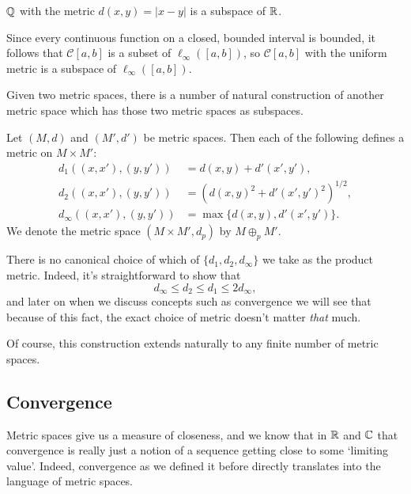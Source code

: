 \documentclass[a4paper]{scrartcl}
\begin{document}
\begin{example}[$\Q$ is a subspace of $\R$]
$\Q$ with the metric $d(x, y) = |x - y|$ is a subspace of $\R$.   
\end{example}

\begin{example}
    Since every continuous function on a closed, bounded interval is bounded, it follows that $\mathcal{C}[a, b]$ is a subset of $\ell_{\infty}([a, b])$, so $\mathcal{C}[a, b]$ with the uniform metric is a subspace of $\ell_{\infty}([a, b])$.
\end{example}

Given two metric spaces, there is a number of natural construction of another metric space which has those two metric spaces as subspaces.

\begin{definition}    
    Let $(M, d)$ and $(M', d')$ be metric spaces. Then each of the following defines a metric on $M \times M'$:
    \begin{align*}
        d_1((x, x'), (y, y')) &= d(x, y) + d'(x', y') ,\\
        d_2((x, x'), (y, y')) &= \left(d(x, y)^2 + d'(x', y')^2\right)^{1/2} ,\\
        d_{\infty}((x, x'), (y, y')) &= \max\{d(x, y), d'(x', y')\}.
    \end{align*}
    We denote the metric space $(M \times M', d_p)$ by $M \oplus_p M'$.
\end{definition}

\begin{remark}
    There is no canonical choice of which of $\{d_1, d_2, d_{\infty}\}$ we take as the product metric. Indeed, it's straightforward to show that
    $$
    d_{\infty} \leq d_2 \leq d_1 \leq 2 d_{\infty},
    $$
    and later on when we discuss concepts such as convergence we will see that because of this fact, the exact choice of metric doesn't matter \emph{that} much.
\end{remark}

Of course, this construction extends naturally to any finite number of metric spaces.

\subsection{Convergence}

Metric spaces give us a measure of closeness, and we know that in $\R$ and $\mathbb{C}$ that convergence is really just a notion of a sequence getting close to some `limiting value'. Indeed, convergence as we defined it before directly translates into the language of metric spaces.
\end{document}
